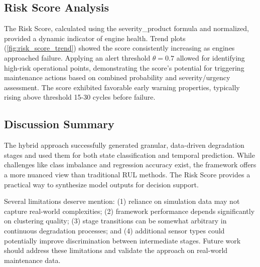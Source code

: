 \subsection{Risk Score Analysis}
The Risk Score, calculated using the severity\_product formula and normalized, provided a dynamic indicator of engine health. Trend plots (\cref{fig:risk_score_trend}) showed the score consistently increasing as engines approached failure. Applying an alert threshold $\theta = 0.7$ allowed for identifying high-risk operational points, demonstrating the score's potential for triggering maintenance actions based on combined probability and severity/urgency assessment. The score exhibited favorable early warning properties, typically rising above threshold 15-30 cycles before failure.

\subsection{Discussion Summary}
The hybrid approach successfully generated granular, data-driven degradation stages and used them for both state classification and temporal prediction. While challenges like class imbalance and regression accuracy exist, the framework offers a more nuanced view than traditional RUL methods. The Risk Score provides a practical way to synthesize model outputs for decision support.

Several limitations deserve mention: (1) reliance on simulation data may not capture real-world complexities; (2) framework performance depends significantly on clustering quality; (3) stage transitions can be somewhat arbitrary in continuous degradation processes; and (4) additional sensor types could potentially improve discrimination between intermediate stages. Future work should address these limitations and validate the approach on real-world maintenance data.
